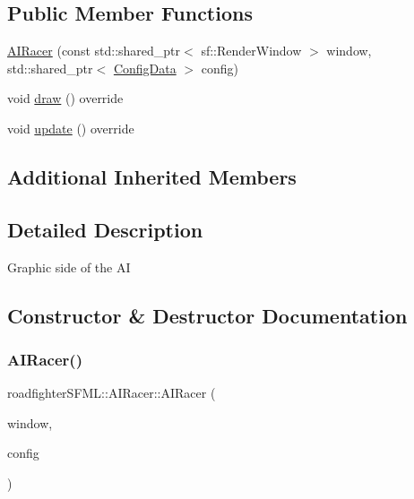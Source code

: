 \subsection*{Public Member Functions}
\begin{DoxyCompactItemize}
\item 
\hyperlink{classroadfighterSFML_1_1AIRacer_a357c65d57f1560a4c0d00da98820578b}{A\+I\+Racer} (const std\+::shared\+\_\+ptr$<$ sf\+::\+Render\+Window $>$ window, std\+::shared\+\_\+ptr$<$ \hyperlink{classConfigData}{Config\+Data} $>$ config)
\item 
void \hyperlink{classroadfighterSFML_1_1AIRacer_a50d966c9d59e09a155d69e2c2296fb4e}{draw} () override
\item 
void \hyperlink{classroadfighterSFML_1_1AIRacer_aaecd91860a2ac61ef671000e311b7860}{update} () override
\end{DoxyCompactItemize}
\subsection*{Additional Inherited Members}


\subsection{Detailed Description}
Graphic side of the AI 

\subsection{Constructor \& Destructor Documentation}
\mbox{\label{classroadfighterSFML_1_1AIRacer_a357c65d57f1560a4c0d00da98820578b}} 
\subsubsection{\texorpdfstring{A\+I\+Racer()}{AIRacer()}}
{\footnotesize\ttfamily roadfighter\+S\+F\+M\+L\+::\+A\+I\+Racer\+::\+A\+I\+Racer (\begin{DoxyParamCaption}\item[{const std\+::shared\+\_\+ptr$<$ sf\+::\+Render\+Window $>$}]{window,  }\item[{std\+::shared\+\_\+ptr$<$ \hyperlink{classConfigData}{Config\+Data} $>$}]{config }\end{DoxyParamCaption})}

